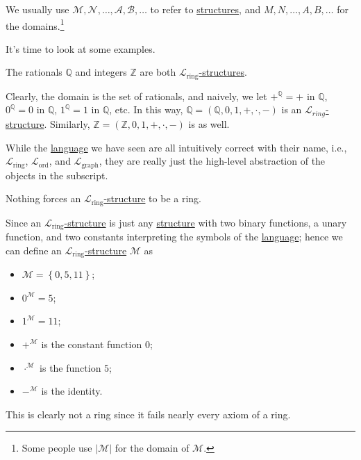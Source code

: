 \begin{notation}
	We usually use \(\mathcal{M} , \mathcal{N} , \ldots , \mathcal{A} , \mathcal{B} , \ldots \) to refer to \hyperref[def:structure]{structures}, and \(M, N, \ldots , A, B, \ldots \) for the domains.\footnote{Some people use \(\vert \mathcal{M}  \vert \) for the domain of \(\mathcal{M} \).}
\end{notation}

It's time to look at some examples.

\begin{eg}
	The rationals \(\mathbb{Q} \) and integers \(\mathbb{Z} \) are both \hyperref[def:structure]{\(\mathcal{L} _{\text{ring} }\)-structures}.
\end{eg}
\begin{explanation}
	Clearly, the domain is the set of rationals, and naively, we let \(+^{\mathbb{Q} } = +\) in \(\mathbb{Q} \), \(0^{\mathbb{Q} } = 0\) in \(\mathbb{Q} \), \(1^{\mathbb{Q} } = 1\) in \(\mathbb{Q} \), etc. In this way, \(\mathbb{Q} = (\mathbb{Q} , 0, 1, +, \cdot, -)\) is an \hyperref[def:structure]{\(\mathcal{L} _{ring}\)-structure}. Similarly, \(\mathbb{Z} = (\mathbb{Z} , 0, 1, +, \cdot, -)\) is as well.
\end{explanation}

While the \hyperref[def:language]{language} we have seen are all intuitively correct with their name, i.e., \(\mathcal{L} _{\text{ring} }\), \(\mathcal{L} _{\text{ord} }\), and \(\mathcal{L} _{\text{graph} }\), they are really just the high-level abstraction of the objects in the subscript.

\begin{eg}
	Nothing forces an \hyperref[def:structure]{\(\mathcal{L} _{\text{ring} }\)-structure} to be a ring.
\end{eg}
\begin{explanation}
	Since an \hyperref[def:structure]{\(\mathcal{L} _{\text{ring} }\)-structure} is just any \hyperref[def:structure]{structure} with two binary functions, a unary function, and two constants interpreting the symbols of the \hyperref[def:language]{language}; hence we can define an \hyperref[def:structure]{\(\mathcal{L} _{\text{ring} }\)-structure} \(\mathcal{M} \) as
	\begin{itemize}
		\item \(\mathcal{M} = \left\{ 0, 5, 11 \right\} \);
		\item \(0^{\mathcal{M} } = 5\);
		\item \(1^{\mathcal{M} } = 11\);
		\item \(+^{\mathcal{M} } \) is the constant function \(0\);
		\item \(\cdot^{\mathcal{M} }\) is the function \(5\);
		\item \(-^{\mathcal{M} }\) is the identity.
	\end{itemize}
	This is clearly not a ring since it fails nearly every axiom of a ring.
\end{explanation}

